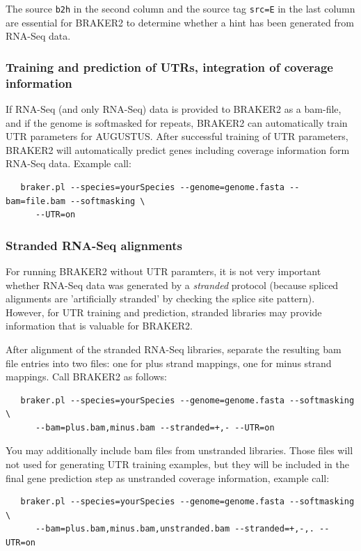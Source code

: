 \documentclass[a4paper,10pt]{report}
\begin{document}
The source \texttt{b2h} in the second column and the source tag \texttt{src=E} in the last column are essential for BRAKER2 to determine whether a hint has been generated from RNA-Seq data. 

\subsubsection{Training and prediction of UTRs, integration of coverage information}

If RNA-Seq (and only RNA-Seq) data is provided to BRAKER2 as a bam-file, and if the genome is softmasked for repeats, BRAKER2 can automatically train UTR parameters for AUGUSTUS. After successful training of UTR parameters, BRAKER2 will automatically predict genes including coverage information form RNA-Seq data. Example call:

\begin{verbatim}
   braker.pl --species=yourSpecies --genome=genome.fasta --bam=file.bam --softmasking \
      --UTR=on
\end{verbatim}

\subsubsection{Stranded RNA-Seq alignments}

For running BRAKER2 without UTR paramters, it is not very important whether RNA-Seq data was generated by a \textit{stranded} protocol (because spliced alignments are 'artificially stranded' by checking the splice site pattern). However, for UTR training and prediction, stranded libraries may provide information that is valuable for BRAKER2.

After alignment of the stranded RNA-Seq libraries, separate the resulting bam file entries into two files: one for plus strand mappings, one for minus strand mappings. Call BRAKER2 as follows:

\begin{verbatim}
   braker.pl --species=yourSpecies --genome=genome.fasta --softmasking \
      --bam=plus.bam,minus.bam --stranded=+,- --UTR=on
\end{verbatim}

You may additionally include bam files from unstranded libraries. Those files will not used for generating UTR training examples, but they will be included in the final gene prediction step as unstranded coverage information, example call:

\begin{verbatim}
   braker.pl --species=yourSpecies --genome=genome.fasta --softmasking \
      --bam=plus.bam,minus.bam,unstranded.bam --stranded=+,-,. --UTR=on
\end{verbatim}
\end{document}
